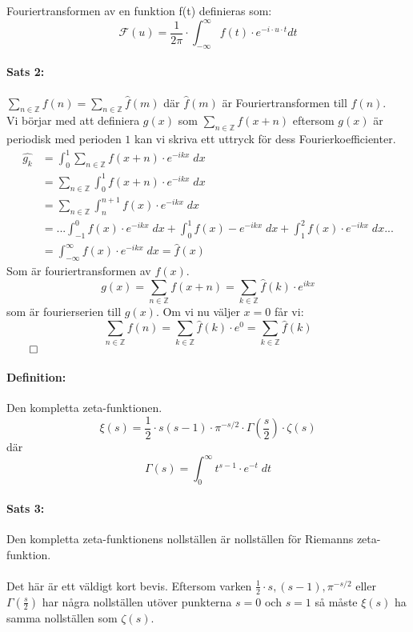 \documentclass{article}%
\begin{document}
Fouriertransformen av en funktion f(t) definieras som:
$$\mathcal{F}(u) = \frac 1 {2\pi} \cdot \int_{-\infty}^\infty f(t) \cdot e^{- i \cdot u \cdot t} dt$$
\pagebreak
\paragraph{Sats 2:} 
$\sum\limits_{n \in \mathbb{Z}} f(n) = \sum\limits_{n \in \mathbb{Z}} \hat{f}(m)$ där $\hat{f}(m)$ är Fouriertransformen till $f(n)$. \\
Vi börjar med att definiera $g(x)$ som $\sum\limits_{n \in \mathbb{Z}} f(x + n)$ eftersom $g(x)$ är periodisk med perioden $1$
kan vi skriva ett uttryck för dess Fourierkoefficienter.
\begin{align*}
	\hat{g_k} &= \int_0^1 \sum_{n \in \mathbb{Z}} f(x + n) \cdot e^{-ikx}\; dx \\
			  &= \sum_{n \in \mathbb{Z}} \int_0^1 f(x + n) \cdot e^{-ikx}\; dx \\
			  &= \sum_{n \in \mathbb{Z}} \int_n^{n + 1} f(x) \cdot e^{-ikx}\; dx \\
			  &= ... \int_{-1}^0 f(x) \cdot e^{-ikx}\; dx + \int_0^1 f(x) - e^{-ikx}\; dx + \int_1^2 f(x) \cdot e^{-ikx}\; dx ... \\
			  &= \int_{- \infty}^\infty f(x) \cdot e^{-ikx}\; dx = \hat{f}(x)
\end{align*}
Som är fouriertransformen av $f(x)$.
$$g(x) = \sum_{n \in \mathbb{Z}} f(x + n) = \sum_{k \in \mathbb{Z}} \hat{f}(k) \cdot e^{ikx}$$%
som är fourierserien till $g(x)$. Om vi nu väljer $x = 0$ får vi:
$$\sum_{n \in \mathbb{Z}} f(n) = \sum_{k \in \mathbb{Z}} \hat{f}(k) \cdot e^0 = \sum_{k \in \mathbb{Z}} \hat{f}(k)$$
$\hfill \qed$
\paragraph{Definition:}
Den kompletta zeta-funktionen.\\
$$\xi (s) = \frac 1 2 \cdot s(s - 1) \cdot \pi^{-s/2} \cdot \Gamma(\frac s 2) \cdot \zeta(s)$$
där
$$\Gamma(s) = \int_0^\infty t^{s - 1} \cdot e^{-t}\; dt$$

\pagebreak
\paragraph{Sats 3:} Den kompletta zeta-funktionens nollställen är nollställen för Riemanns zeta-funktion. \\
\\
Det här är ett väldigt kort bevis. Eftersom varken ${\frac 1 2 \cdot s, (s - 1), \pi^{-s/2}}$ eller $\Gamma(\frac s 2)$
har några nollställen utöver punkterna $s = 0$ och $s = 1$ så måste $\xi(s)$ ha samma nollställen som $\zeta(s)$.
\end{document}
